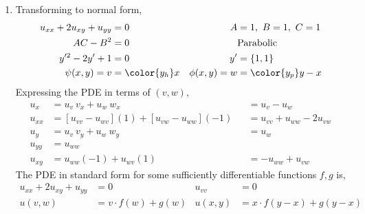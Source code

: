 \begin{enumerate}
    \item Transforming to normal form,
          \begin{align}
              u_{xx} + 2u_{xy} + u_{yy} & = 0                 &
              A                         & = 1,\ B = 1,\ C = 1   \\
              AC - B^2                  & = 0                 &
                                        & \text{Parabolic}      \\
              y'^2 - 2y' + 1            & = 0                 &
              y'                        & = \{1, 1\}            \\
              \psi(x, y) = v            & = \color{y_h} x     &
              \phi(x, y) = w            & = \color{y_p} y - x
          \end{align}
          Expressing the PDE in terms of $ (v, w) $,
          \begin{align}
              u_{x}  & = u_v\ v_x + u_w\ w_x                             &
                     & = u_v - u_w                                         \\
              u_{xx} & = [u_{vv} - u_{wv}] (1) +  [u_{vw} - u_{ww}] (-1) &
                     & = u_{vv} + u_{ww} - 2u_{vw}                         \\
              u_{y}  & = u_v\ v_y + u_w\ w_y                             &
                     & = u_w                                               \\
              u_{yy} & = u_{ww}                                            \\
              u_{xy} & = u_{ww}(-1) + u_{wv}(1)                          &
                     & = - u_{ww} + u_{vw}
          \end{align}
          The PDE in standard form for some sufficiently differentiable functions
          $ f, g $ is,
          \begin{align}
              u_{xx} + 2u_{xy} + u_{yy} & = 0                           &
              u_{vv}                    & = 0                             \\
              u(v, w)                   & = v \cdot f(w) + g(w)         &
              u(x, y)                   & = x \cdot f(y - x) + g(y - x)
          \end{align}


\end{enumerate}
